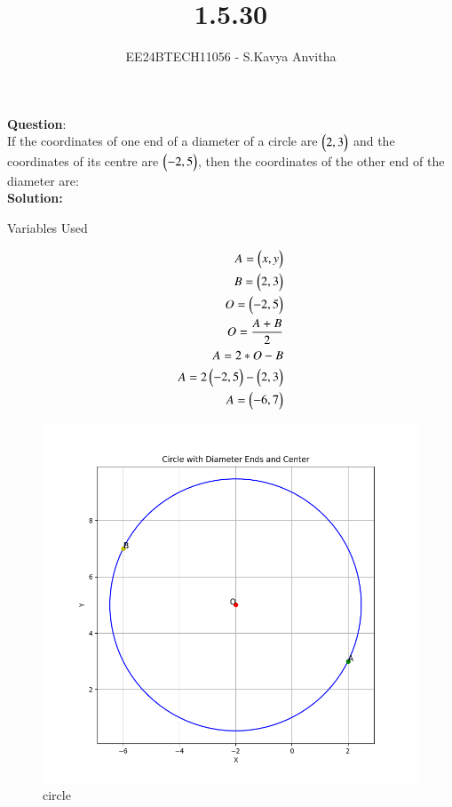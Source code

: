 \documentclass[journal]{IEEEtran}
\begin{document}

\vspace{3cm}

\title{1.5.30}
\author{EE24BTECH11056 - S.Kavya Anvitha}
{\let\newpage\relax\maketitle}

\renewcommand{\thefigure}{\theenumi}
\renewcommand{\thetable}{\theenumi}
\setlength{\intextsep}{10pt} %


\renewcommand{\thetable}{\theenumi}


\textbf{Question}:\\
If the coordinates of one end of a diameter of a circle are $\begin{pmatrix}2, 3\end{pmatrix}$ and the coordinates of its centre are $\begin{pmatrix}-2, 5\end{pmatrix}$, then the coordinates of the other end of the diameter are:
\\
\textbf{Solution: }
\begin{table}[h!]    
  \centering
  
  \caption{Variables Used}
  \label{tab1.5.30}
\end{table}

\begin{align}
	A = \begin{pmatrix}x,y\end{pmatrix}\\
	B = \begin{pmatrix}2,3\end{pmatrix}\\
	O = \begin{pmatrix}-2,5\end{pmatrix}\\
	O = \frac{A+B}{2}\\
	A = 2*O-B\\
        A = 2\begin{pmatrix}-2,5\end{pmatrix}-\begin{pmatrix}2,3\end{pmatrix}\\
	A = \begin{pmatrix}-6,7\end{pmatrix}\\
\end{align}
\begin{figure}[h!]
   \centering
   \includegraphics[width=0.7\linewidth]{figs/Figure_1.png}
   \caption{circle}
\end{figure}
\end{document}
